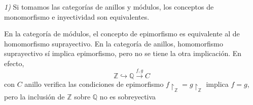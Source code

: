 \documentclass[../main.tex]{subfiles}
\begin{document}
\begin{remark}
\textit{1)} Si tomamos las categorías de anillos y módulos, los conceptos de monomorfismo e inyectividad son equivalentes.

 En la categoría de módulos, el concepto de epimorfismo es equivalente al de homomorfismo suprayectivo. En la categoría de anillos, homomorfismo suprayectivo sí implica epimorfismo, pero no se tiene la otra implicación. En efecto, $$\mathbb{Z}\hookrightarrow \mathbb{Q}\overset{f,g}{\longrightarrow}C$$con $C$ anillo verifica las condiciones de epimorfismo $f\restriction_{\mathbb{Z}}= g\restriction_{\mathbb{Z}}$ implica $f=g$, pero la inclusión de $\mathbb{Z}$ sobre $\mathbb{Q}$ no es sobreyectiva
\end{remark}
\end{document}

